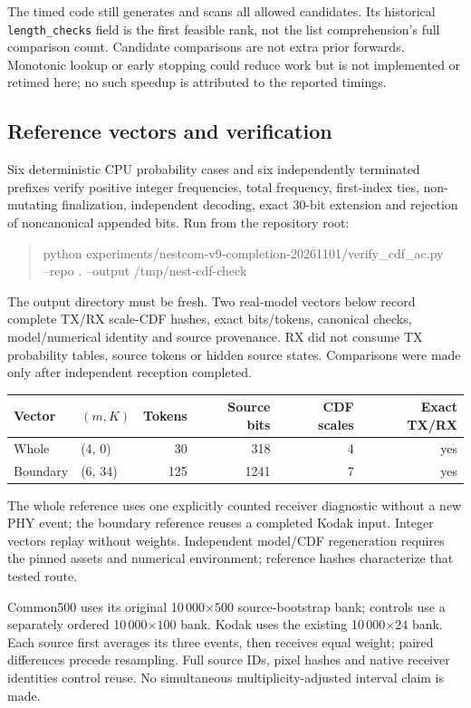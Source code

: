 \documentclass[10pt,letterpaper]{article}
\begin{document}
The timed code still generates and scans all allowed candidates. Its historical \texttt{length\_checks} field is the first feasible rank, not the list comprehension's full comparison count. Candidate comparisons are not extra prior forwards. Monotonic lookup or early stopping could reduce work but is not implemented or retimed here; no such speedup is attributed to the reported timings.


\subsection{Reference vectors and verification}
Six deterministic CPU probability cases and six independently terminated prefixes verify positive integer frequencies, total frequency, first-index ties, non-mutating finalization, independent decoding, exact 30-bit extension and rejection of noncanonical appended bits. Run from the repository root:
\begin{quote}\ttfamily\small
python experiments/nestcom-v9-completion-20261101/verify\_cdf\_ac.py\\
\quad --repo . --output /tmp/nest-cdf-check
\end{quote}
The output directory must be fresh. Two real-model vectors below record complete TX/RX scale-CDF hashes, exact bits/tokens, canonical checks, model/numerical identity and source provenance. RX did not consume TX probability tables, source tokens or hidden source states. Comparisons were made only after independent reception completed.

\begin{longtable}{@{}llrrrr@{}}\toprule
Vector & $(m,K)$ & Tokens & Source bits & CDF scales & Exact TX/RX\\\midrule\endhead
Whole & (4, 0) & 30 & 318 & 4 & yes\\
Boundary & (6, 34) & 125 & 1241 & 7 & yes\\
\bottomrule\end{longtable}

The whole reference uses one explicitly counted receiver diagnostic without a new PHY event; the boundary reference reuses a completed Kodak input. Integer vectors replay without weights. Independent model/CDF regeneration requires the pinned assets and numerical environment; reference hashes characterize that tested route.

Common500 uses its original 10\,000$\times500$ source-bootstrap bank; controls use a separately ordered 10\,000$\times100$ bank. Kodak uses the existing 10\,000$\times24$ bank. Each source first averages its three events, then receives equal weight; paired differences precede resampling. Full source IDs, pixel hashes and native receiver identities control reuse. No simultaneous multiplicity-adjusted interval claim is made.
\end{document}
